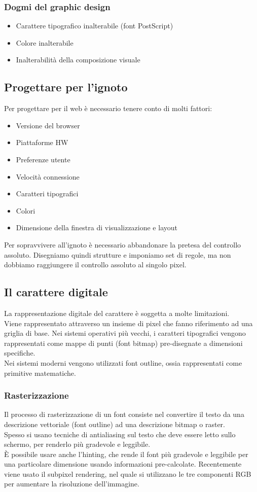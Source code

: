 \documentclass{article}
\begin{document}
\subsubsection{Dogmi del graphic design}
\begin{itemize}
\item Carattere tipografico inalterabile (font PostScript)
\item Colore inalterabile
\item Inalterabilità della composizione visuale
\end{itemize}
\subsection{Progettare per l'ignoto}
Per progettare per il web è necessario tenere conto di molti fattori:
\begin{itemize}
\item Versione del browser
\item Piattaforme HW 
\item Preferenze utente
\item Velocità connessione
\item Caratteri tipografici
\item Colori
\item Dimensione della finestra di visualizzazione e layout
\end{itemize}
Per sopravvivere all'ignoto è necessario abbandonare la pretesa del controllo assoluto. Disegniamo quindi strutture e imponiamo set di regole, ma non dobbiamo raggiungere il controllo assoluto al singolo pixel.
\subsection{Il carattere digitale}
La rappresentazione digitale del carattere è soggetta a molte limitazioni.\\
Viene rappresentato attraverso un insieme di pixel che fanno riferimento ad una griglia di base. Nei sistemi operativi più vecchi, i caratteri tipografici vengono rappresentati come mappe di punti (font bitmap) pre-disegnate a dimensioni specifiche.\\
Nei sistemi moderni vengono utilizzati font outline, ossia rappresentati come primitive matematiche.\\
\subsubsection{Rasterizzazione}
Il processo di rasterizzazione di un font consiste nel convertire il testo da una descrizione vettoriale (font outline) ad una descrizione bitmap o raster.\\
Spesso si usano tecniche di antialiasing sul testo che deve essere letto sullo schermo, per renderlo più gradevole e leggibile.\\
È possibile usare anche l'hinting, che rende il font più gradevole e leggibile per una particolare dimensione usando informazioni pre-calcolate. Recentemente viene usato il subpixel rendering, nel quale si utilizzano le tre componenti RGB per aumentare la risoluzione dell'immagine.
\end{document}
